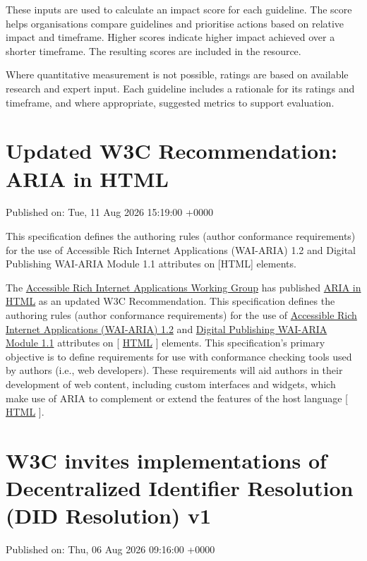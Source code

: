 \documentclass[11pt,a4paper]{article}
\begin{document}
These inputs are used to calculate an impact score for each guideline. The score helps organisations compare guidelines and prioritise actions based on relative impact and timeframe. Higher scores indicate higher impact achieved over a shorter timeframe. The resulting scores are included in the resource.

Where quantitative measurement is not possible, ratings are based on available research and expert input. Each guideline includes a rationale for its ratings and timeframe, and where appropriate, suggested metrics to support evaluation.

\section{Updated W3C Recommendation: ARIA in HTML}

Published on: Tue, 11 Aug 2026 15:19:00 +0000

This specification defines the authoring rules (author conformance requirements) for the use of Accessible Rich Internet Applications (WAI-ARIA) 1.2 and Digital Publishing WAI-ARIA Module 1.1 attributes on [HTML] elements.

The \href{https://www.w3.org/groups/wg/aria/}{Accessible Rich Internet Applications Working Group} has published \href{https://www.w3.org/TR/2026/REC-html-aria-20260811/}{ARIA in HTML} as an updated W3C Recommendation. This specification defines the authoring rules (author conformance requirements) for the use of \href{https://www.w3.org/TR/wai-aria-1.2/}{Accessible Rich Internet Applications (WAI-ARIA) 1.2} and \href{https://www.w3.org/TR/dpub-aria-1.1/}{Digital Publishing WAI-ARIA Module 1.1} attributes on [ \href{https://www.w3.org/TR/2026/REC-html-aria-20260811/\#bib-html}{HTML} ] elements. This specification's primary objective is to define requirements for use with conformance checking tools used by authors (i.e., web developers). These requirements will aid authors in their development of web content, including custom interfaces and widgets, which make use of ARIA to complement or extend the features of the host language [ \href{https://www.w3.org/TR/2026/REC-html-aria-20260811/\#bib-html}{HTML} ].

\section{W3C invites implementations of Decentralized Identifier Resolution (DID Resolution) v1}

Published on: Thu, 06 Aug 2026 09:16:00 +0000
\end{document}
